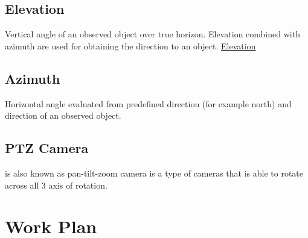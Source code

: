 \subsection{Elevation}
Vertical angle of an observed object over true horizon. Elevation combined with azimuth are used for obtaining the direction to an object. \href{https://ru.wikipedia.org/wiki/%D0%A3%D0%B3%D0%BE%D0%BB_%D0%BC%D0%B5%D1%81%D1%82%D0%B0}{Elevation}

\subsection{Azimuth}
Horizontal angle evaluated from predefined direction (for example north) and direction of an observed object.

\subsection{PTZ Camera}
is also known as pan-tilt-zoom camera is a type of cameras that is able to rotate across all 3 axis of rotation.

\section{Work Plan}


